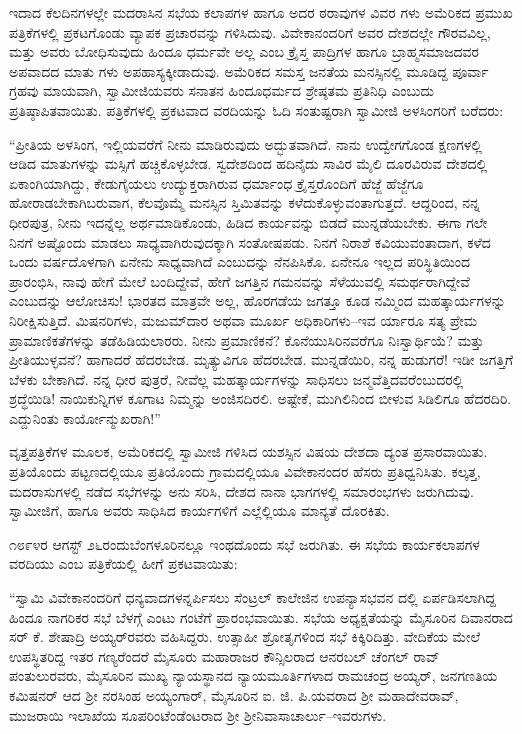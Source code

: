 ಇದಾದ ಕೆಲದಿನಗಳಲ್ಲೇ ಮದರಾಸಿನ ಸಭೆಯ ಕಲಾಪಗಳ ಹಾಗೂ ಅದರ ಠರಾವುಗಳ ವಿವರ ಗಳು ಅಮೆರಿಕದ ಪ್ರಮುಖ ಪತ್ರಿಕೆಗಳಲ್ಲಿ ಪ್ರಕಟಗೊಂಡು ವ್ಯಾಪಕ ಪ್ರಚಾರವನ್ನು ಗಳಿಸಿದುವು. ವಿವೇಕಾನಂದರಿಗೆ ಅವರ ದೇಶದಲ್ಲೇ ಗೌರವವಿಲ್ಲ, ಮತ್ತು ಅವರು ಬೋಧಿಸುವುದು ಹಿಂದೂ ಧರ್ಮವೇ ಅಲ್ಲ ಎಂಬ ಕ್ರೈಸ್ತ ಪಾದ್ರಿಗಳ ಹಾಗೂ ಬ್ರಾಹ್ಮಸಮಾಜದವರ ಅಪವಾದದ ಮಾತು ಗಳು ಅಪಹಾಸ್ಯಕ್ಕೀಡಾದುವು. ಅಮೆರಿಕದ ಸಮಸ್ತ ಜನತೆಯ ಮನಸ್ಸಿನಲ್ಲಿ ಮೂಡಿದ್ದ ಪೂರ್ವಾ ಗ್ರಹವು ಮಾಯವಾಗಿ, ಸ್ವಾಮೀಜಿಯವರು ಸನಾತನ ಹಿಂದೂಧರ್ಮದ ಶ್ರೇಷ್ಠತಮ ಪ್ರತಿನಿಧಿ ಎಂಬುದು ಪ್ರತಿಷ್ಠಾಪಿತವಾಯಿತು. ಪತ್ರಿಕೆಗಳಲ್ಲಿ ಪ್ರಕಟವಾದ ವರದಿಯನ್ನು ಓದಿ ಸಂತುಷ್ಟರಾಗಿ ಸ್ವಾಮೀಜಿ ಅಳಸಿಂಗರಿಗೆ ಬರೆದರು:

“ಪ್ರೀತಿಯ ಅಳಸಿಂಗ, ಇಲ್ಲಿಯವರೆಗೆ ನೀನು ಮಾಡಿರುವುದು ಅದ್ಭುತವಾಗಿದೆ. ನಾನು ಉದ್ವೇಗಗೊಂಡ ಕ್ಷಣಗಳಲ್ಲಿ ಆಡಿದ ಮಾತುಗಳನ್ನು ಮಸ್ಸಿಗೆ ಹಚ್ಚಿಕೊಳ್ಳಬೇಡ. ಸ್ವದೇಶದಿಂದ ಹದಿನೈದು ಸಾವಿರ ಮೈಲಿ ದೂರವಿರುವ ದೇಶದಲ್ಲಿ ಏಕಾಂಗಿಯಾಗಿದ್ದು, ಕೇಡುಗೈಯಲು ಉದ್ಯುಕ್ತರಾಗಿರುವ ಧರ್ಮಾಂಧ ಕ್ರೈಸ್ತರೊಂದಿಗೆ ಹೆಜ್ಜೆ ಹೆಜ್ಜೆಗೂ ಹೋರಾಡಬೇಕಾಗಿಬರುವಾಗ, ಕೆಲವೊಮ್ಮೆ ಮನಸ್ಸಿನ ಸ್ತಿಮಿತವನ್ನು ಕಳೆದುಕೊಳ್ಳುವಂತಾಗುತ್ತದೆ. ಆದ್ದರಿಂದ, ನನ್ನ ಧೀರಪುತ್ರ, ನೀನು ಇದನ್ನೆಲ್ಲ ಅರ್ಥಮಾಡಿಕೊಂಡು, ಹಿಡಿದ ಕಾರ್ಯವನ್ನು ಬಿಡದೆ ಮುನ್ನಡೆಯಬೇಕು. ಈಗಾ ಗಲೇ ನಿನಗೆ ಅಷ್ಟೊಂದು ಮಾಡಲು ಸಾಧ್ಯವಾಗಿರುವುದಕ್ಕಾಗಿ ಸಂತೋಷಪಡು. ನಿನಗೆ ನಿರಾಶೆ ಕವಿಯುವಂತಾದಾಗ, ಕಳೆದ ಒಂದು ವರ್ಷದೊಳಗಾಗಿ ಏನೇನು ಸಾಧ್ಯವಾಗಿದೆ ಎಂಬುದನ್ನು ನೆನಪಿಸಿಕೊ. ಏನೇನೂ ಇಲ್ಲದ ಪರಿಸ್ಥಿತಿಯಿಂದ ಪ್ರಾರಂಭಿಸಿ, ನಾವು ಹೇಗೆ ಮೇಲೆ ಬಂದಿದ್ದೇವೆ, ಹೇಗೆ ಜಗತ್ತಿನ ಗಮನವನ್ನು ಸೆಳೆಯುವಲ್ಲಿ ಸಮರ್ಥರಾಗಿದ್ದೇವೆ ಎಂಬುದನ್ನು ಆಲೋಚಿಸು! ಭಾರತದ ಮಾತ್ರವೇ ಅಲ್ಲ, ಹೊರಗಡೆಯ ಜಗತ್ತೂ ಕೂಡ ನಮ್ಮಿಂದ ಮಹತ್ಕಾರ್ಯಗಳನ್ನು ನಿರೀಕ್ಷಿಸುತ್ತಿದೆ. ಮಿಷನರಿಗಳು, ಮಜುಮ್​ದಾರ ಅಥವಾ ಮೂರ್ಖ ಅಧಿಕಾರಿಗಳು–ಇವ ರ್ಯಾರೂ ಸತ್ಯ ಪ್ರೇಮ ಪ್ರಾಮಾಣಿಕತೆಗಳನ್ನು ತಡೆಹಿಡಿಯಲಾರರು. ನೀನು ಪ್ರಮಾಣಿಕನೆ? ಕೊನೆಯುಸಿರಿನವರೆಗೂ ನಿಃಸ್ವಾರ್ಥಿಯೆ? ಮತ್ತು ಪ್ರೀತಿಯುಳ್ಳವನೆ? ಹಾಗಾದರೆ ಹೆದರಬೇಡ. ಮೃತ್ಯುವಿಗೂ ಹೆದರಬೇಡ. ಮುನ್ನಡೆಯಿರಿ, ನನ್ನ ಹುಡುಗರೆ! ಇಡೀ ಜಗತ್ತಿಗೆ ಬೆಳಕು ಬೇಕಾಗಿದೆ. ನನ್ನ ಧೀರ ಪುತ್ರರೆ, ನೀವೆಲ್ಲ ಮಹತ್ಕಾರ್ಯಗಳನ್ನು ಸಾಧಿಸಲು ಜನ್ಮವೆತ್ತಿದವರೆಂಬುದರಲ್ಲಿ ಶ್ರದ್ಧೆಯಿಡಿ! ನಾಯಿಕುನ್ನಿಗಳ ಕೂಗಾಟ ನಿಮ್ಮನ್ನು ಅಂಜಿಸದಿರಲಿ. ಅಷ್ಟೇಕೆ, ಮುಗಿಲಿನಿಂದ ಬೀಳುವ ಸಿಡಿಲಿಗೂ ಹೆದರದಿರಿ. ಎದ್ದುನಿಂತು ಕಾರ್ಯೋನ್ಮುಖರಾಗಿ!”

ವೃತ್ತಪತ್ರಿಕೆಗಳ ಮೂಲಕ, ಅಮೆರಿಕದಲ್ಲಿ ಸ್ವಾಮೀಜಿ ಗಳಿಸಿದ ಯಶಸ್ಸಿನ ವಿಷಯ ದೇಶದಾ ದ್ಯಂತ ಪ್ರಸಾರವಾಯಿತು. ಪ್ರತಿಯೊಂದು ಪಟ್ಟಣದಲ್ಲಿಯೂ ಪ್ರತಿಯೊಂದು ಗ್ರಾಮದಲ್ಲಿಯೂ ವಿವೇಕಾನಂದರ ಹೆಸರು ಪ್ರತಿಧ್ವನಿಸಿತು. ಕಲ್ಕತ್ತ, ಮದರಾಸುಗಳಲ್ಲಿ ನಡೆದ ಸಭೆಗಳನ್ನು ಅನು ಸರಿಸಿ, ದೇಶದ ನಾನಾ ಭಾಗಗಳಲ್ಲಿ ಸಮಾರಂಭಗಳು ಜರುಗಿದುವು. ಸ್ವಾಮೀಜಿಗೆ, ಹಾಗೂ ಅವರು ಸಾಧಿಸಿದ ಕಾರ್ಯಗಳಿಗೆ ಎಲ್ಲೆಲ್ಲಿಯೂ ಮಾನ್ಯತೆ ದೊರಕಿತು.

೧೮೯೪ರ ಆಗಸ್ಟ್ ೨೬ರಂದುಬೆಂಗಳೂರಿನಲ್ಲೂ ಇಂಥದೊಂದು ಸಭೆ ಜರುಗಿತು. ಈ ಸಭೆಯ ಕಾರ್ಯಕಲಾಪಗಳ ವರದಿಯು  ಎಂಬ ಪತ್ರಿಕೆಯಲ್ಲಿ ಹೀಗೆ ಪ್ರಕಟವಾಯಿತು:

“ಸ್ವಾಮಿ ವಿವೇಕಾನಂದರಿಗೆ ಧನ್ಯವಾದಗಳನ್ನರ್ಪಿಸಲು ಸೆಂಟ್ರಲ್ ಕಾಲೇಜಿನ ಉಪನ್ಯಾಸಭವನ ದಲ್ಲಿ ಏರ್ಪಡಿಸಲಾಗಿದ್ದ ಹಿಂದೂ ನಾಗರಿಕರ ಸಭೆ ಬೆಳಗ್ಗೆ ಎಂಟು ಗಂಟೆಗೆ ಪ್ರಾರಂಭವಾಯಿತು. ಸಭೆಯ ಅಧ್ಯಕ್ಷತೆಯನ್ನು ಮೈಸೂರಿನ ದಿವಾನರಾದ ಸರ್ ಕೆ. ಶೇಷಾದ್ರಿ ಅಯ್ಯರ್​ರವರು ವಹಿಸಿದ್ದರು. ಉತ್ಸಾಹೀ ಶ್ರೋತೃಗಳಿಂದ ಸಭೆ ಕಿಕ್ಕಿರಿದಿತ್ತು. ವೇದಿಕೆಯ ಮೇಲೆ ಉಪಸ್ಥಿತರಿದ್ದ ಇತರ ಗಣ್ಯರೆಂದರೆ ಮೈಸೂರು ಮಹಾರಾಜರ ಕೌನ್ಸಿಲರಾದ ಆನರಬಲ್ ಚೆಂಗಲ್ ರಾವ್ ಪಂತುಲುರವರು, ಮೈಸೂರಿನ ಮುಖ್ಯ ನ್ಯಾಯಸ್ಥಾನದ ನ್ಯಾಯಮೂರ್ತಿಗಳಾದ ರಾಮಚಂದ್ರ ಅಯ್ಯರ್, ಜನಗಣತಿಯ ಕಮಿಷನರ್ ಆದ ಶ್ರೀ ನರಸಿಂಹ ಅಯ್ಯಂಗಾರ್, ಮೈಸೂರಿನ ಐ. ಜಿ. ಪಿ.ಯವರಾದ ಶ್ರೀ ಮಹಾದೇವರಾವ್, ಮುಜರಾಯಿ ಇಲಾಖೆಯ ಸೂಪರಿಂಟೆಂಡೆಂಟರಾದ ಶ್ರೀ ಶ್ರೀನಿವಾಸಾಚಾರ್ಲು–ಇವರುಗಳು.

